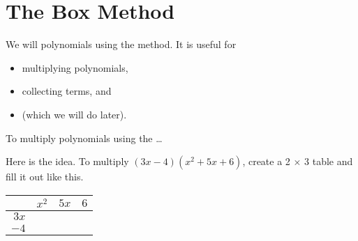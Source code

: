 \section{The Box Method}

We will  polynomials using the  method.
It is useful for
\begin{itemize}[nosep]
    \item multiplying  polynomials,
    \item collecting  terms, and 
    \item {} (which we will do later).
\end{itemize}
\vspace{1\baselineskip}

\begin{myConceptSteps}{To multiply polynomials using the \dots}
\end{myConceptSteps}

Here is the idea. To multiply $(3x-4)(x^2 + 5x + 6)$, 
create a 2 $\times$ 3 table and fill it out like this.

\begin{center}
    \Large
    \renewcommand{\arraystretch}{1.5}
    \begin{tabular}{r||p{0.75in}|p{0.75in}|p{0.75in}|}
        & $x^2$ & $5x$ & $6$ \\
        \hline\hline
        $3x$ & & & \\ 
        \hline
        $-4$ & & & \\
        \hline
    \end{tabular}
\end{center}
